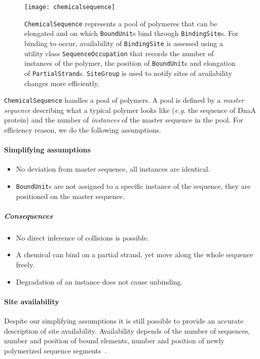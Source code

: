\begin{figure}[!h]
  \centering
  \texttt{[image: chemicalsequence]}
  \caption{\texttt{ChemicalSequence} represents a pool of polymeres that can be elongated and on which \texttt{BoundUnit}s bind through \texttt{BindingSite}s. For binding to occur, availability of \texttt{BindingSite} is assessed using a utility class \texttt{SequenceOccupation} that records the number of instances of the polymer, the position of \texttt{BoundUnit}s and elongation of \texttt{PartialStrand}s. \texttt{SiteGroup} is used to notify sites of availability changes more efficiently.}
  \label{fig:det_chemical_sequence}
\end{figure}

\texttt{ChemicalSequence} handles a pool of polymers. A pool is defined by a \emph{master sequence} describing what a typical polymer looks like (\textit{e.g.} the sequence of DnaA protein) and the number of \emph{instances} of the master sequence in the pool. For efficiency reason, we do the following assumptions.

\paragraph{Simplifying assumptions}
\begin{itemize}
\item No deviation from master sequence, all instances are identical.
\item \texttt{BoundUnit}s are not assigned to a specific instance of the sequence, they are positioned on the  master sequence.
\end{itemize}

\subparagraph{Consequences}
\begin{itemize}
\item No direct inference of collisions is possible.
\item A chemical can bind on a partial strand, yet move along the whole sequence freely.
\item Degradation of an instance does not cause unbinding.
\end{itemize}

\paragraph{Site availability}
Despite our simplifying assumptions it is still possible to provide an accurate description of site availability. Availability depends of the number of sequences, number and position of bound elements, number and position of newly polymerized sequence segments~.

